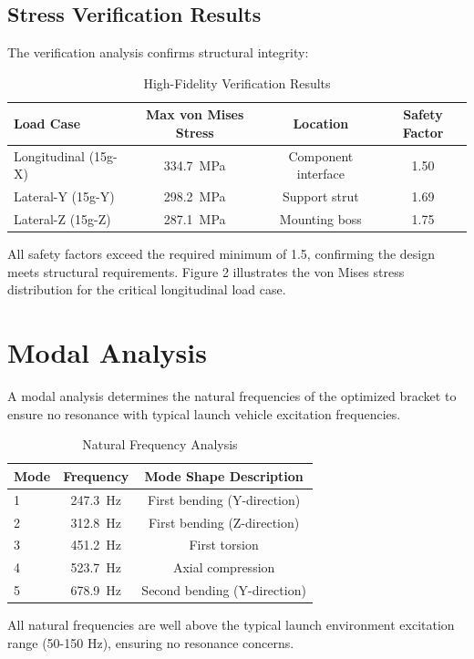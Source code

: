 \documentclass[11pt]{report}
\begin{document}
\subsection{Stress Verification Results}
The verification analysis confirms structural integrity:
\begin{table}[h]
\centering
\caption{High-Fidelity Verification Results}
\begin{tabular}{@{}lccc@{}}
\toprule
Load Case & Max von Mises Stress & Location & Safety Factor \\ 
\midrule
Longitudinal (15g-X) & \SI{334.7}{\mega\pascal} & Component interface & 1.50 \\
Lateral-Y (15g-Y) & \SI{298.2}{\mega\pascal} & Support strut & 1.69 \\
Lateral-Z (15g-Z) & \SI{287.1}{\mega\pascal} & Mounting boss & 1.75 \\
\bottomrule
\end{tabular}
\end{table}
All safety factors exceed the required minimum of 1.5, confirming the design meets structural requirements. Figure 2 illustrates the von Mises stress distribution for the critical longitudinal load case.

\section{Modal Analysis}
A modal analysis determines the natural frequencies of the optimized bracket to ensure no resonance with typical launch vehicle excitation frequencies.
\begin{table}[h]
\centering
\caption{Natural Frequency Analysis}
\begin{tabular}{@{}lcc@{}}
\toprule
Mode & Frequency & Mode Shape Description \\ 
\midrule
1 & \SI{247.3}{\hertz} & First bending (Y-direction) \\
2 & \SI{312.8}{\hertz} & First bending (Z-direction) \\
3 & \SI{451.2}{\hertz} & First torsion \\
4 & \SI{523.7}{\hertz} & Axial compression \\
5 & \SI{678.9}{\hertz} & Second bending (Y-direction) \\
\bottomrule
\end{tabular}
\end{table}
All natural frequencies are well above the typical launch environment excitation range (50-150 Hz), ensuring no resonance concerns.
\end{document}
